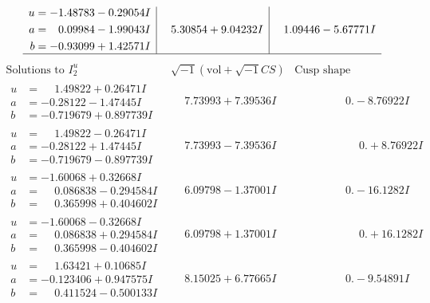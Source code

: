 \documentclass[1p]{elsarticle_modified}
\theoremstyle{definition}
\newcommand{\I}{\sqrt{-1}}
\begin{document}
$$\begin{array}{c|c|c}
\begin{aligned}
u &= -1.48783 - 0.29054 I \\
a &= \phantom{-}0.09984 - 1.99043 I \\
b &= -0.93099 + 1.42571 I\end{aligned}
 & \phantom{-}5.30854 + 9.04232 I & \phantom{-}1.09446 - 5.67771 I\\
 \hline 
 \end{array}$$\newpage$$\begin{array}{c|c|c}  
\text{Solutions to }I^u_{2}& \I (\text{vol} + \sqrt{-1}CS) & \text{Cusp shape}\\
 \hline 
\begin{aligned}
u &= \phantom{-}1.49822 + 0.26471 I \\
a &= -0.28122 - 1.47445 I \\
b &= -0.719679 + 0.897739 I\end{aligned}
 & \phantom{-}7.73993 + 7.39536 I & \phantom{-0.000000 } 0. - 8.76922 I \\ \hline\begin{aligned}
u &= \phantom{-}1.49822 - 0.26471 I \\
a &= -0.28122 + 1.47445 I \\
b &= -0.719679 - 0.897739 I\end{aligned}
 & \phantom{-}7.73993 - 7.39536 I & \phantom{-0.000000 -}0. + 8.76922 I \\ \hline\begin{aligned}
u &= -1.60068 + 0.32668 I \\
a &= \phantom{-}0.086838 - 0.294584 I \\
b &= \phantom{-}0.365998 + 0.404602 I\end{aligned}
 & \phantom{-}6.09798 - 1.37001 I & \phantom{-0.000000 } 0. - 16.1282 I \\ \hline\begin{aligned}
u &= -1.60068 - 0.32668 I \\
a &= \phantom{-}0.086838 + 0.294584 I \\
b &= \phantom{-}0.365998 - 0.404602 I\end{aligned}
 & \phantom{-}6.09798 + 1.37001 I & \phantom{-0.000000 -}0. + 16.1282 I \\ \hline\begin{aligned}
u &= \phantom{-}1.63421 + 0.10685 I \\
a &= -0.123406 + 0.947575 I \\
b &= \phantom{-}0.411524 - 0.500133 I\end{aligned}
 & \phantom{-}8.15025 + 6.77665 I & \phantom{-0.000000 } 0. - 9.54891 I \\ \hline\begin{aligned}

\end{aligned}
\end{array}$$
\end{document}

